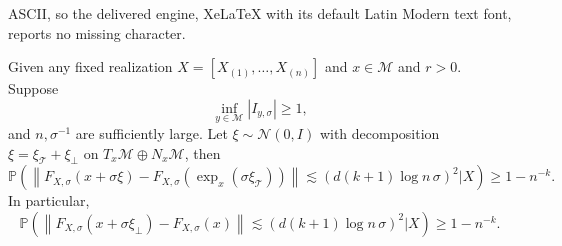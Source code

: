 \documentclass[10pt,a4paper]{amsart}
\def\calM{\mathcal{M}}
\begin{document}
ASCII, so the delivered engine, XeLaTeX with its default Latin Modern text font, reports no missing character.
\begin{thm}
\label{thm:NWproj}
Given any fixed realization $X=[X_{(1)},\ldots,X_{(n)}]$ and $x\in \calM$ and $r>0$. Suppose 
\[
\inf_{y\in\calM}|I_{y,\sigma}|\geq  1, 
\]
and $n,\sigma^{-1}$ are sufficiently large.
Let $\xi\sim \mathcal{N}(0,I)$ with decomposition $\xi=\xi_{\mathcal{T}}+\xi_\bot$ on $T_x\calM\oplus N_x\calM$, then 
\[
\mathbb{P}\left( \left\| F_{X,\sigma}(x + \sigma \xi) - F_{X,\sigma}(\exp_x(\sigma \xi_{\mathcal{T}}))\right\| \lesssim (d(k+1)\log n\, \sigma)^2|X \right) \ge 1 - n^{-k}. 
\]
In particular, 
\[
\mathbb{P}\left( \left\| F_{X,\sigma}(x + \sigma \xi_\bot) - F_{X,\sigma}(x)\right\| \lesssim (d(k+1)\log n\, \sigma)^2|X \right) \ge 1 - n^{-k}. 
\]
\end{thm}
\end{document}
